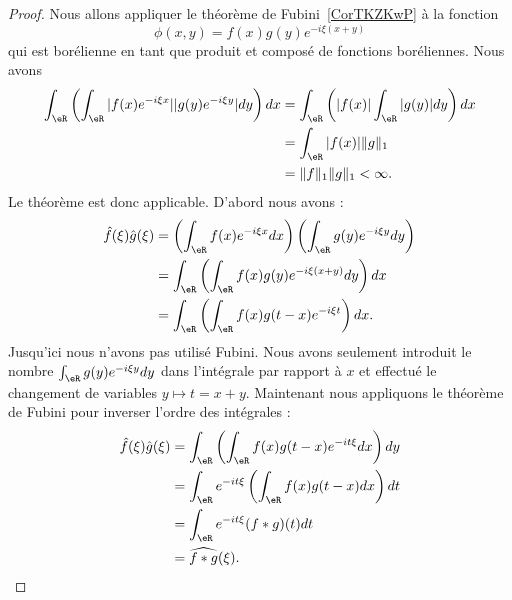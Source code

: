\begin{proof}
	Nous allons appliquer le théorème de Fubini~\ref{CorTKZKwP} à la fonction
	\begin{equation}
		\phi(x,y)=f(x)g(y) e^{-i\xi(x+y)}
	\end{equation}
	qui est borélienne en tant que produit et composé de fonctions boréliennes. Nous avons
	\begin{subequations}
		\begin{align}
			\int_{\eR}\left( \int_{\eR}| f(x) e^{-i\xi x} | |g(y) e^{-i\xi y} |dy \right)dx & =\int_{\eR}\left( | f(x) |\int_{\eR}| g(y) |dy \right)dx \\
			                                                                                & =\int_{\eR}| f(x) |\| g \|_1                             \\
			                                                                                & =\| f \|_1\| g \|_1<\infty.
		\end{align}
	\end{subequations}
	Le théorème est donc applicable. D'abord nous avons :
	\begin{subequations}
		\begin{align}
			\hat f(\xi)\hat g(\xi) & =\left(\int_{\eR}f(x) e^{-i\xi x}dx\right)\left(\int_{\eR}g(y) e^{-i\xi y}dy\right) \\
			                       & =\int_{\eR}\left( \int_{\eR}f(x)g(y) e^{-i\xi(x+y)}dy \right)dx                     \\
			                       & =\int_{\eR}\left( \int_{\eR}f(x)g(t-x) e^{-i\xi t} \right)dx.
		\end{align}
	\end{subequations}
	Jusqu'ici nous n'avons pas utilisé Fubini. Nous avons seulement introduit le nombre \( \int_{\eR}g(y) e^{-i\xi y}dy\) dans l'intégrale par rapport à \( x\) et effectué le changement de variables \( y\mapsto t=x+y\). Maintenant nous appliquons le théorème de Fubini pour inverser l'ordre des intégrales :
	\begin{subequations}
		\begin{align}
			\hat f(\xi)\hat g(\xi) & =\int_{\eR}\left( \int_{\eR}f(x)g(t-x) e^{-it\xi}dx \right)dy \\
			                       & =\int_{\eR} e^{-it\xi}\left( \int_{\eR}f(x)g(t-x)dx \right)dt \\
			                       & =\int_{\eR} e^{-it\xi}(f*g)(t)dt                              \\
			                       & =\widehat{f*g}(\xi).
		\end{align}
	\end{subequations}
\end{proof}


